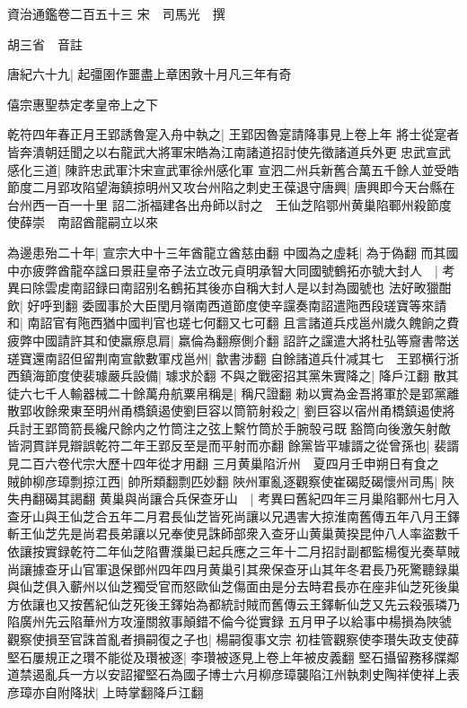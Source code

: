 資治通鑑卷二百五十三
宋　司馬光　撰

胡三省　音註

唐紀六十九|{
	起彊圉作噩盡上章困敦十月凡三年有奇}


僖宗惠聖恭定孝皇帝上之下

乾符四年春正月王郢誘魯寔入舟中執之|{
	王郢因魯寔請降事見上卷上年}
將士從寔者皆奔潰朝廷聞之以右龍武大將軍宋皓為江南諸道招討使先徵諸道兵外更忠武宣武感化三道|{
	陳許忠武軍汴宋宣武軍徐州感化軍}
宣泗二州兵新舊合萬五千餘人並受皓節度二月郢攻陷望海鎮掠明州又攻台州陷之刺史王葆退守唐興|{
	唐興即今天台縣在台州西一百一十里}
詔二浙福建各出舟師以討之　王仙芝陷鄂州黄巢陷鄆州殺節度使薛崇　南詔酋龍嗣立以來

為邊患殆二十年|{
	宣宗大中十三年酋龍立酋慈由翻}
中國為之虛耗|{
	為于偽翻}
而其國中亦疲弊酋龍卒諡曰景莊皇帝子法立改元貞明承智大同國號鶴拓亦號大封人　|{
	考異曰除雲䖍南詔録曰南詔别名鶴拓其後亦自稱大封人是以封為國號也}
法好畋獵酣飲|{
	好呼到翻}
委國事於大臣閏月嶺南西道節度使辛讜奏南詔遣陁西段瑳寶等來請和|{
	南詔官有陁西猶中國判官也瑳七何翻又七可翻}
且言諸道兵戍邕州歲久餽餉之費疲弊中國請許其和使羸瘵息肩|{
	羸倫為翻瘵側介翻}
詔許之讜遣大將杜弘等齎書幣送瑳寶還南詔但留荆南宣歙數軍戍邕州|{
	歙書涉翻}
自餘諸道兵什减其七　王郢横行浙西鎮海節度使裴璩嚴兵設備|{
	璩求於翻}
不與之戰密招其黨朱實降之|{
	降戶江翻}
散其徒六七千人輸器械二十餘萬舟航粟帛稱是|{
	稱尺證翻}
勑以實為金吾將軍於是郢黨離散郢收餘衆東至明州甬橋鎮遏使劉巨容以筒箭射殺之|{
	劉巨容以宿州甬橋鎮遏使將兵討王郢筒箭長纔尺餘内之竹筒注之弦上繫竹筒於手腕彀弓既豁筒向後激矢射敵皆洞貫詳見辯誤乾符二年王郢反至是而平射而亦翻}
餘黨皆平璩諝之從曾孫也|{
	裴諝見二百六卷代宗大歷十四年從才用翻}
三月黄巢陷沂州　夏四月壬申朔日有食之　賊帥柳彦璋剽掠江西|{
	帥所類翻剽匹妙翻}
陜州軍亂逐觀察使崔碣貶碣懷州司馬|{
	陜失冉翻碣其謁翻}
黄巢與尚讓合兵保查牙山　|{
	考異曰舊紀四年三月巢陷鄆州七月入查牙山與王仙芝合五年二月君長仙芝皆死尚讓以兄遇害大掠淮南舊傳五年八月王鐸斬王仙芝先是尚君長弟讓以兄奉使見誅師部衆入查牙山黄巢黄揆昆仲八人率盜數千依讓按實録乾符二年仙芝陷曹濮巢已起兵應之三年十二月招討副都監楊復光奏草賊尚讓據查牙山官軍退保鄧州四年四月黄巢引其衆保查牙山其年冬君長乃死驚聽録巢與仙芝俱入蘄州以仙芝獨受官而怒歐仙芝傷面由是分去時君長亦在座非仙芝死後巢方依讓也又按舊紀仙芝死後王鐸始為都統討賊而舊傳云王鐸斬仙芝又先云殺張璘乃陷廣州先云陷華州方攻潼關敘事顛錯不倫今從實録}
五月甲子以給事中楊損為陜虢觀察使損至官誅首亂者損嗣復之子也|{
	楊嗣復事文宗}
初桂管觀察使李瓚失政支使薛堅石屢規正之瓚不能從及瓚被逐|{
	李瓚被逐見上卷上年被皮義翻}
堅石攝留務移牒鄰道禁遏亂兵一方以安詔擢堅石為國子博士六月柳彦璋襲陷江州執刺史陶祥使祥上表彦璋亦自附降狀|{
	上時掌翻降戶江翻}
